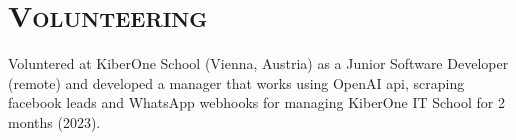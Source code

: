 \section{\textsc{Volunteering}}


Voluntered at KiberOne School (Vienna, Austria) as a Junior Software Developer (remote) and developed a manager that works using OpenAI api, scraping facebook leads and WhatsApp webhooks for managing KiberOne IT School for 2 months (2023).

